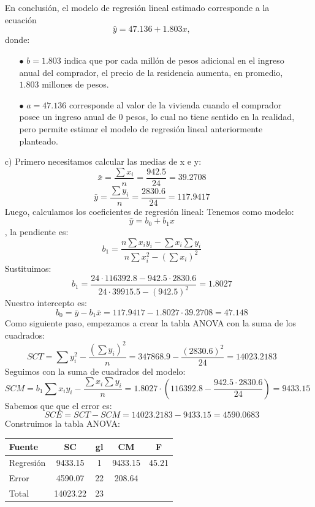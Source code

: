 \documentclass[12pt,a4paper]{article}
\begin{document}
\begin{itemize}
$$    $$
    \newline
    En conclusión, el modelo de regresión lineal estimado corresponde a la ecuación
    $$
        \hat{y} = 47.136 + 1.803x,
    $$
    donde:
    \begin{itemize}
        \item [$\bullet$] $b = 1.803$ indica que por cada millón de pesos adicional en el ingreso anual del comprador, el precio de la residencia aumenta, en promedio, $1.803$ millones de pesos.
        \item [$\bullet$] $a = 47.136$ corresponde al valor de la vivienda cuando el comprador posee un ingreso anual de 0 pesos, lo cual no tiene sentido en la realidad, pero permite estimar el modelo de regresión lineal anteriormente planteado.
    \end{itemize}
	
	\item [c)] Primero necesitamos calcular las medias de x e y:
    $$\bar{x}=\frac{\sum x_i}{n}=\frac{942.5}{24}=39.2708$$
    $$\bar{y}=\frac{\sum y_i}{n}=\frac{2830.6}{24}=117.9417$$
    Luego, calculamos los coeficientes de regresión lineal:
    Tenemos como modelo:$$\hat{y}=b_0+b_1x$$, la pendiente es: $$b_1=\frac{n\sum x_i y_i-\sum x_i\sum y_i}{n\sum x_i^2-(\sum x_i)^2}$$
    Sustituimos: $$b_1=\frac{24\cdot116392.8-942.5\cdot2830.6}{24\cdot39915.5-(942.5)^2}=1.8027$$
    Nuestro intercepto es: $$b_0=\bar{y}-b_1\bar{x}=117.9417-1.8027\cdot39.2708=47.148$$
    Como siguiente paso, empezamos a crear la tabla ANOVA con la suma de los cuadrados: $$SCT=\sum y_i^2-\frac{(\sum y_i)^2}{n}=347868.9-\frac{(2830.6)^2}{24}=14023.2183$$
    Seguimos con la suma de cuadrados del modelo: $$SCM=b_1\sum x_i y_i-\frac{\sum x_i\sum y_i}{n}=1.8027\cdot\left(116392.8-\frac{942.5\cdot2830.6}{24}\right)=9433.15$$
    Sabemos que que el error es: $$SCE=SCT-SCM=14023.2183-9433.15=4590.0683$$
    Construimos la tabla ANOVA:
    \begin{center}
        \begin{tabular}{|l|c|c|c|c|}
        \hline
        \textbf{Fuente}       & \textbf{SC}      & \textbf{gl} & \textbf{CM}       & \textbf{F}      \\
        \hline
        Regresión             & 9433.15          & 1           & 9433.15           & 45.21           \\
        Error                 & 4590.07          & 22          & 208.64            &                 \\
        Total                 & 14023.22         & 23          &                   &                 \\
        \hline
        \end{tabular}
    \end{center}
\end{itemize}
\end{document}
